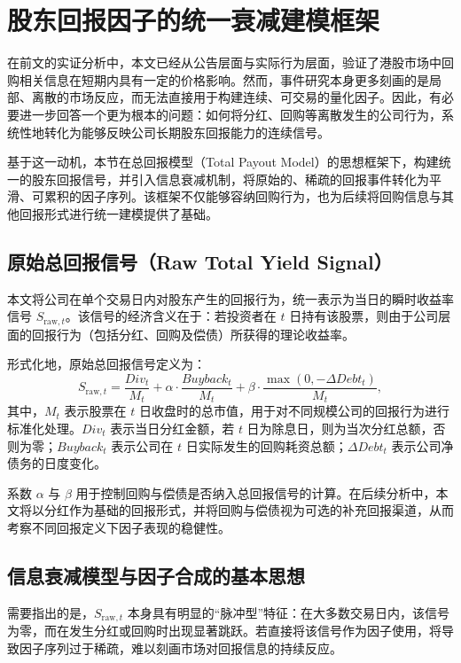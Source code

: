 \documentclass[a4paper,10pt]{article}
\begin{document}
\section{股东回报因子的统一衰减建模框架}

在前文的实证分析中，本文已经从公告层面与实际行为层面，验证了港股市场中回购相关信息在短期内具有一定的价格影响。然而，事件研究本身更多刻画的是局部、离散的市场反应，而无法直接用于构建连续、可交易的量化因子。因此，有必要进一步回答一个更为根本的问题：如何将分红、回购等离散发生的公司行为，系统性地转化为能够反映公司长期股东回报能力的连续信号。

基于这一动机，本节在总回报模型（Total Payout Model）的思想框架下，构建统一的股东回报信号，并引入信息衰减机制，将原始的、稀疏的回报事件转化为平滑、可累积的因子序列。该框架不仅能够容纳回购行为，也为后续将回购信息与其他回报形式进行统一建模提供了基础。

\subsection{原始总回报信号（Raw Total Yield Signal）}

本文将公司在单个交易日内对股东产生的回报行为，统一表示为当日的瞬时收益率信号 $S_{\text{raw},t}$。该信号的经济含义在于：若投资者在 $t$ 日持有该股票，则由于公司层面的回报行为（包括分红、回购及偿债）所获得的理论收益率。

形式化地，原始总回报信号定义为：
\begin{equation}
S_{\text{raw},t}
=
\frac{Div_t}{M_t}
+
\alpha \cdot \frac{Buyback_t}{M_t}
+
\beta \cdot \frac{\max(0,-\Delta Debt_t)}{M_t},
\end{equation}
其中，$M_t$ 表示股票在 $t$ 日收盘时的总市值，用于对不同规模公司的回报行为进行标准化处理。$Div_t$ 表示当日分红金额，若 $t$ 日为除息日，则为当次分红总额，否则为零；$Buyback_t$ 表示公司在 $t$ 日实际发生的回购耗资总额；$\Delta Debt_t$ 表示公司净债务的日度变化。

系数 $\alpha$ 与 $\beta$ 用于控制回购与偿债是否纳入总回报信号的计算。在后续分析中，本文将以分红作为基础的回报形式，并将回购与偿债视为可选的补充回报渠道，从而考察不同回报定义下因子表现的稳健性。

\subsection{信息衰减模型与因子合成的基本思想}

需要指出的是，$S_{\text{raw},t}$ 本身具有明显的“脉冲型”特征：在大多数交易日内，该信号为零，而在发生分红或回购时出现显著跳跃。若直接将该信号作为因子使用，将导致因子序列过于稀疏，难以刻画市场对回报信息的持续反应。
\end{document}
